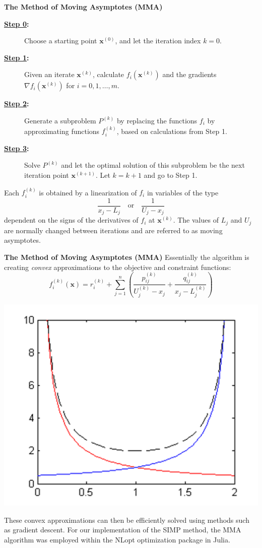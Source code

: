\documentclass[final]{beamer}
\begin{document}
{\small
\begin{frame}[t]{\textbf{The Method of Moving Asymptotes (MMA)}}
	\begin{description}
		\item[\textbf{\underline{Step 0}:}] Choose a starting point $\mathbf{x}^{(0)}$, and let the iteration index $k=0$.
		\item[\textbf{\underline{Step 1}:}] Given an iterate $\mathbf{x}^{(k)}$, calculate $f_i(\mathbf{x}^{(k)})$ and the gradients $\nabla f_i(\mathbf{x}^{(k)})$ for $i=0,1,\ldots,m$.
		\item[\textbf{\underline{Step 2}:}] Generate a subproblem $P^{(k)}$ by replacing the functions $f_i$ by approximating functions $f_i^{(k)}$, based on calculations from Step 1.
		\item[\textbf{\underline{Step 3}:}] Solve $P^{(k)}$ and let the optimal solution of this subproblem be the next iteration point $\mathbf{x}^{(k+1)}$. Let $k=k+1$ and go to Step 1.
	\end{description}\pause
	Each $f_i^{(k)}$ is obtained by a linearization of $f_i$ in variables of the type $$\frac{1}{x_j-L_j}\quad\text{or}\quad\frac{1}{U_j-x_j}$$ dependent on the signs of the derivatives of $f_i$ at $\mathbf{x}^{(k)}$. The values of $L_j$ and $U_j$ are normally changed between iterations and are referred to as moving asymptotes.
\end{frame}
}

\begin{frame}{\textbf{The Method of Moving Asymptotes (MMA)}}
	Essentially the algorithm is creating \textit{convex} approximations to the objective and constraint functions: $$f_i^{(k)}(\mathbf{x})=r_i^{(k)}+\sum\limits_{j=1}^{n}\left(\frac{p_{ij}^{(k)}}{U_j^{(k)}-x_j}+\frac{q_{ij}^{(k)}}{x_j-L_j^{(k)}}\right)$$\vfill\pause
	\begin{center}
		\includegraphics[width=0.4\linewidth]{MMA-pic.png}\cite{Keulen}
	\end{center}\pause
	These convex approximations can then be efficiently solved using methods such as gradient descent.\vfill\pause
	For our implementation of the SIMP method, the MMA algorithm was employed within the NLopt optimization package in Julia.\vfill
\end{frame}
\end{document}
